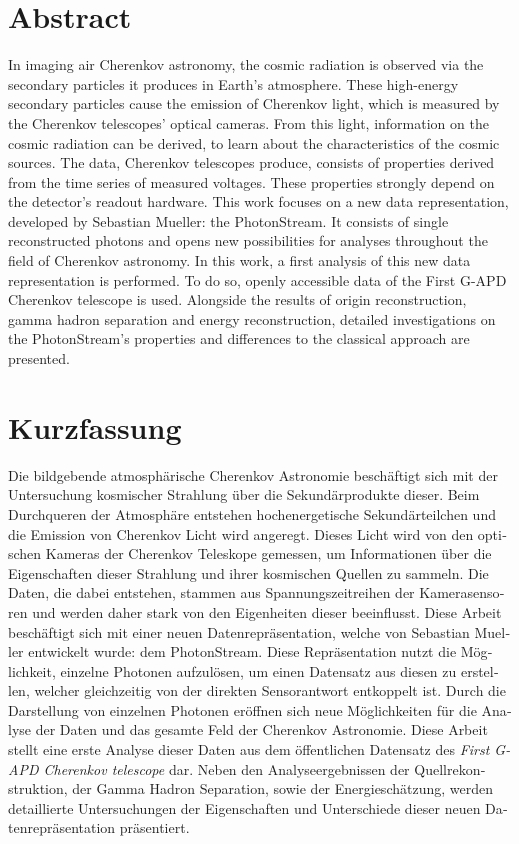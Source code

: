 \thispagestyle{plain}
\section*{\color{tugreen}Abstract}
%
In imaging air Cherenkov astronomy, the cosmic radiation is observed via the
secondary particles it produces in Earth's atmosphere. These high-energy secondary
particles cause the emission of Cherenkov light, which is measured by the
Cherenkov telescopes' optical cameras. From this light, information on the
cosmic radiation can be derived, to learn about the characteristics of the
cosmic sources. The data, Cherenkov telescopes produce, consists of
properties derived from the time series of measured voltages. These properties
strongly depend on the detector's readout hardware. This work focuses on a new
data representation, developed by Sebastian Mueller: the PhotonStream. It
consists of single reconstructed photons and opens new possibilities for
analyses throughout the field of Cherenkov astronomy. In this work, a first analysis of this new data representation is
performed. To do so, openly accessible data of the First G-APD Cherenkov
telescope is used. Alongside the results of origin reconstruction, gamma hadron
separation and energy reconstruction, detailed investigations on the
PhotonStream's properties and differences to the classical approach are
presented.

\section*{\color{tugreen}Kurzfassung}
%
\begin{german}
Die bildgebende atmosphärische Cherenkov Astronomie beschäftigt sich mit der
Untersuchung kosmischer Strahlung über die Sekundärprodukte dieser. Beim
Durchqueren der Atmosphäre entstehen hochenergetische Sekundärteilchen und die
Emission von Cherenkov Licht wird angeregt. Dieses Licht wird von den optischen
Kameras der Cherenkov Teleskope gemessen, um Informationen über die
Eigenschaften dieser Strahlung und ihrer kosmischen Quellen zu sammeln. Die
Daten, die dabei entstehen, stammen aus Spannungszeitreihen der Kamerasensoren
und werden daher stark von den Eigenheiten dieser beeinflusst. Diese Arbeit
beschäftigt sich mit einer neuen Datenrepräsentation, welche von Sebastian
Mueller entwickelt wurde: dem PhotonStream. Diese Repräsentation nutzt die
Möglichkeit, einzelne Photonen aufzulösen, um einen Datensatz aus diesen zu
erstellen, welcher gleichzeitig von der direkten Sensorantwort entkoppelt ist.
Durch die Darstellung von einzelnen Photonen eröffnen sich neue Möglichkeiten
für die Analyse der Daten und das gesamte Feld der Cherenkov Astronomie.
Diese Arbeit stellt eine erste Analyse dieser Daten aus dem
öffentlichen Datensatz des \textit{First G-APD Cherenkov telescope} dar. Neben
den Analyseergebnissen der Quellrekonstruktion, der Gamma Hadron Separation,
sowie der Energieschätzung, werden detaillierte Untersuchungen der
Eigenschaften und Unterschiede dieser neuen Datenrepräsentation präsentiert.
\end{german}
